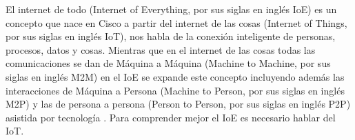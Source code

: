 
El internet de todo (Internet of Everything, por sus siglas en inglés IoE) es un concepto que nace en Cisco a partir del internet de las cosas (Internet of Things, por sus siglas en inglés IoT), nos habla de la conexión inteligente de personas, procesos, datos y cosas. Mientras que en el internet de las cosas todas las comunicaciones se dan de Máquina a Máquina (Machine to Machine, por sus siglas en inglés M2M) en el IoE se expande este concepto incluyendo además las interacciones de Máquina a Persona (Machine to Person, por sus siglas en inglés M2P) y las de persona a persona (Person to Person, por sus siglas en inglés P2P) asistida por tecnología \cite{IoETechTarget}. Para comprender mejor el IoE es necesario hablar del IoT. \\